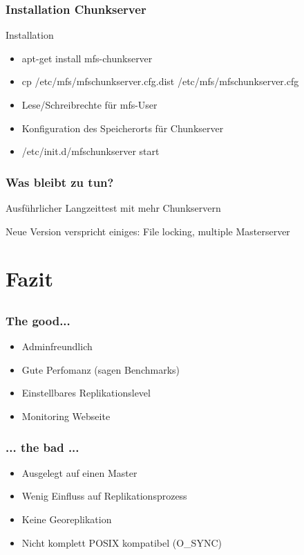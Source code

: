 \documentclass{beamer}
\begin{document}
\begin{frame}
	\frametitle{Installation Chunkserver}
	\begin{block}{Installation}
	\begin{itemize}
		\item apt-get install mfs-chunkserver
		\item cp /etc/mfs/mfschunkserver.cfg.dist /etc/mfs/mfschunkserver.cfg
		\item Lese/Schreibrechte f\"ur mfs-User
		\item Konfiguration des Speicherorts f\"ur Chunkserver
		\item /etc/init.d/mfschunkserver start
	\end{itemize}
	\end{block}
\end{frame}	

\begin{frame}
	\frametitle{Was bleibt zu tun?}

	Ausf\"uhrlicher Langzeittest mit mehr Chunkservern
	
	Neue Version verspricht einiges: File locking, multiple Masterserver

\end{frame}

\section{Fazit}
\subsection*{}

\begin{frame}
	\frametitle{The good...}

	\begin{itemize}
		\item Adminfreundlich
		\item Gute Perfomanz (sagen Benchmarks)
		\item Einstellbares Replikationslevel
		\item Monitoring Webseite
	\end{itemize}
\end{frame}

\begin{frame}
	\frametitle{... the bad ...}
	\begin{itemize}
		\item Ausgelegt auf einen Master
		\item Wenig Einfluss auf Replikationsprozess
		\item Keine Georeplikation
		\item Nicht komplett POSIX kompatibel (O\_SYNC)
	\end{itemize}
\end{frame} 
\end{document}
